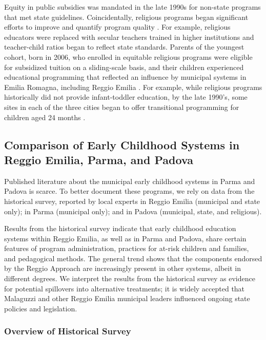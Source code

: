 Equity in public subsidies was mandated in the late 1990s for non-state programs that met state guidelines. Coincidentally, religious programs began significant efforts to improve and quantify program quality \citep{Malizia-Cicatelli_2011_BOOK_Catholic-School}. For example, religious educators were replaced with secular teachers trained in higher institutions and teacher-child ratios began to reflect state standards. Parents of the youngest cohort, born in 2006, who enrolled in equitable religious programs were eligible for subsidized tuition on a sliding-scale basis, and their children experienced educational programming that reflected an influence by municipal systems in Emilia Romagna, including Reggio Emilia \citep{Hohnerlein_2009_Paradox-Public-Preschools,OECD_2001_Italy-Country-Note}. For example, while religious programs historically did not provide infant-toddler education, by the late 1990's, some sites in each of the three cities began to offer transitional programming for children aged 24 months \citep{Malizia-Cicatelli_2011_BOOK_Catholic-School,CEHD_2016_Historical-Analysis}. 

\subsection{Comparison of Early Childhood Systems in Reggio Emilia, Parma, and Padova}

Published literature about the municipal early childhood systems in Parma and Padova is scarce. To better document these programs, we rely on data from the historical survey, reported by local experts in Reggio Emilia (municipal and state only); in Parma (municipal only); and in Padova (municipal, state, and religious).

Results from the historical survey indicate that early childhood education systems within Reggio Emilia, as well as in Parma and Padova, share certain features of program administration, practices for at-risk children and families, and pedagogical methods. The general trend shows that the components endorsed by the Reggio Approach are increasingly present in other systems, albeit in different degrees. We interpret the results from the historical survey as evidence for potential spillovers into alternative treatments; it is widely accepted that Malaguzzi and other Reggio Emilia municipal leaders influenced ongoing state policies and legislation. 

\subsubsection{Overview of Historical Survey} \label{sec:survey-overview}

